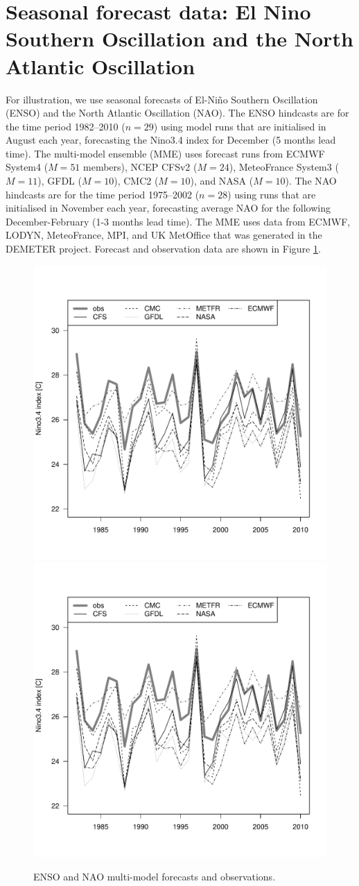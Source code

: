 \documentclass[12pt]{article}
\begin{document}
\section{Seasonal forecast data: El Nino Southern Oscillation and the North Atlantic Oscillation}

For illustration, we use seasonal forecasts of El-Ni\~no Southern Oscillation (ENSO) and the North Atlantic Oscillation (NAO).
The ENSO hindcasts are for the time period 1982--2010 ($n=29$) using model runs that are initialised in August each year, forecasting the Nino3.4 index for December (5 months lead time). 
The multi-model ensemble (MME) uses forecast runs from ECMWF System4 ($M=51$ members), NCEP CFSv2 ($M=24$), MeteoFrance System3 ($M=11$), GFDL ($M=10$), CMC2 ($M=10$), and NASA ($M=10$).
The NAO hindcasts are for the time period 1975--2002 ($n=28$) using runs that are initialised in November each year, forecasting average NAO for the following December-February (1-3 months lead time).
The MME uses data from ECMWF, LODYN, MeteoFrance, MPI, and UK MetOffice that was generated in the DEMETER project.
Forecast and observation data are shown in Figure \ref{fig:enso-nao}.
%
\begin{figure}
\begin{center}
\includegraphics[width=.6\textwidth, page=1]{../R/enso_nao.pdf}\\
\includegraphics[width=.6\textwidth, page=2]{../R/enso_nao.pdf}
\end{center}
\caption{ENSO and NAO multi-model forecasts and observations.}
\label{fig:enso-nao}
\end{figure}
\end{document}
